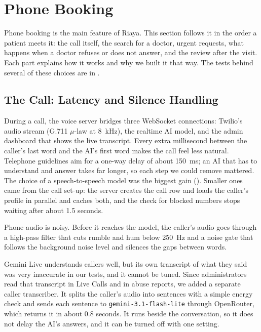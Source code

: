 
\section{Phone Booking}\label{sec:booking}

Phone booking is the main feature of Riaya. This section follows it in the order a patient meets it: the call itself, the search for a doctor, urgent requests, what happens when a doctor refuses or does not answer, and the review after the visit. Each part explains how it works and why we built it that way. The tests behind several of these choices are in .

\subsection{The Call: Latency and Silence Handling}\label{subsec:latency}

During a call, the voice server bridges three WebSocket connections: Twilio's audio stream (G.711 $\mu$-law at 8~kHz), the realtime AI model, and the admin dashboard that shows the live transcript. Every extra millisecond between the caller's last word and the AI's first word makes the call feel less natural. Telephone guidelines aim for a one-way delay of about 150~ms; an AI that has to understand and answer takes far longer, so each step we could remove mattered. The choice of a speech-to-speech model was the biggest gain (). Smaller ones came from the call set-up: the server creates the call row and loads the caller's profile in parallel and caches both, and the check for blocked numbers stops waiting after about 1.5 seconds.

Phone audio is noisy. Before it reaches the model, the caller's audio goes through a high-pass filter that cuts rumble and hum below 250~Hz and a noise gate that follows the background noise level and silences the gaps between words.

Gemini Live understands callers well, but its own transcript of what they said was very inaccurate in our tests, and it cannot be tuned. Since administrators read that transcript in Live Calls and in abuse reports, we added a separate caller transcriber. It splits the caller's audio into sentences with a simple energy check and sends each sentence to \texttt{gemini-3.1-flash-lite} through OpenRouter, which returns it in about 0.8 seconds. It runs beside the conversation, so it does not delay the AI's answers, and it can be turned off with one setting.

